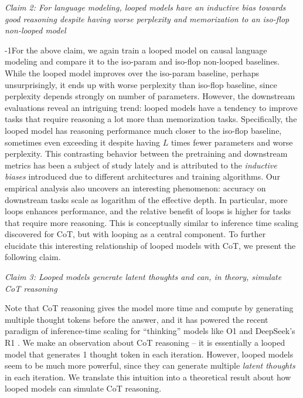 \begin{center}
    \textit{Claim 2: For language modeling, looped models have an inductive bias towards good reasoning despite having worse perplexity and memorization to an iso-flop non-looped model}
\end{center}
\vspace{-0.05in}
\looseness-1For the above claim, we again train a  looped model on causal language modeling and compare it to the iso-param  and iso-flop  non-looped baselines. While the looped model improves over the iso-param baseline, perhaps unsurprisingly, it ends up with worse perplexity than iso-flop baseline, since perplexity depends strongly on number of parameters. However, the downstream evaluations reveal an intriguing trend: looped models have a tendency to improve tasks that require reasoning a lot more than memorization tasks.
Specifically, the looped model has reasoning performance much closer to the iso-flop baseline, sometimes even exceeding it despite having $L$ times fewer parameters and worse perplexity.
This contrasting behavior between the pretraining and downstream metrics has been a subject of study lately \citep{saunshi22understanding,liu2023same} and is attributed to the \emph{inductive biases} introduced due to different architectures and training algorithms. Our empirical analysis also uncovers an interesting phenomenon: accuracy on downstream tasks scale as logarithm of the effective depth. In particular, more loops enhances performance, and the relative benefit of loops is higher for tasks that require more reasoning. This is conceptually similar to inference time scaling discovered for CoT, but with looping as a central component. To further elucidate this interesting relationship of looped models with CoT, we present the following claim.

\vspace{-0.05in}
\begin{center}
    \textit{Claim 3: Looped models generate latent thoughts and can, in theory, simulate CoT reasoning}
\end{center}
\vspace{-0.05in}

Note that CoT reasoning gives the model more time and compute by generating multiple thought tokens before the answer, and it has powered the recent paradigm of inference-time scaling for ``thinking'' models like O1 and DeepSeek's R1 \citep{guo2025deepseek}. We make an observation about CoT reasoning -- it is essentially a looped model that generates 1 thought token in each iteration. However, looped models seem to be much more powerful, since they can generate multiple \emph{latent thoughts} in each iteration. 
We translate this intuition into a theoretical result about how looped models can simulate CoT reasoning.

